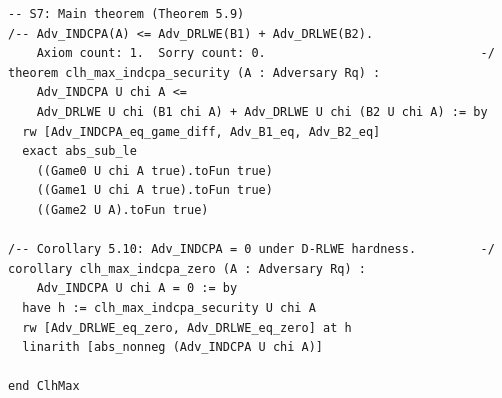 \documentclass[11pt,a4paper]{article}
\theoremstyle{remark}
\begin{document}
\begin{lstlisting}[language={}]
-- S7: Main theorem (Theorem 5.9)
/-- Adv_INDCPA(A) <= Adv_DRLWE(B1) + Adv_DRLWE(B2).
    Axiom count: 1.  Sorry count: 0.                              -/
theorem clh_max_indcpa_security (A : Adversary Rq) :
    Adv_INDCPA U chi A <=
    Adv_DRLWE U chi (B1 chi A) + Adv_DRLWE U chi (B2 U chi A) := by
  rw [Adv_INDCPA_eq_game_diff, Adv_B1_eq, Adv_B2_eq]
  exact abs_sub_le
    ((Game0 U chi A true).toFun true)
    ((Game1 U chi A true).toFun true)
    ((Game2 U A).toFun true)

/-- Corollary 5.10: Adv_INDCPA = 0 under D-RLWE hardness.         -/
corollary clh_max_indcpa_zero (A : Adversary Rq) :
    Adv_INDCPA U chi A = 0 := by
  have h := clh_max_indcpa_security U chi A
  rw [Adv_DRLWE_eq_zero, Adv_DRLWE_eq_zero] at h
  linarith [abs_nonneg (Adv_INDCPA U chi A)]

end ClhMax
\end{lstlisting}
\end{document}
